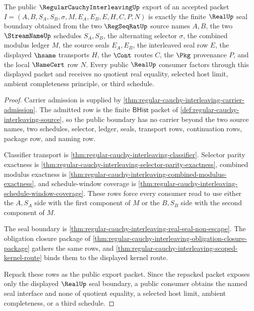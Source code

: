 \begin{theorem}
\label{thm:regular-cauchy-interleaving-public-real-seal-export}
The public $\RegularCauchyInterleavingUp$ export of an accepted packet $I=(A,B,S_A,S_B,\sigma,M,E_A,E_B,E,H,C,P,N)$ is exactly the finite $\RealUp$ seal boundary obtained from the two $\RegSeqRatUp$ source names $A,B$, the two $\StreamNameUp$ schedules $S_A,S_B$, the alternating selector $\sigma$, the combined modulus ledger $M$, the source seals $E_A,E_B$, the interleaved seal row $E$, the displayed $\hsame$ transports $H$, the $\Cont$ routes $C$, the $\Pkg$ provenance $P$, and the local $\NameCert$ row $N$. Every public $\RealUp$ consumer factors through this displayed packet and receives no quotient real equality, selected host limit, ambient completeness principle, or third schedule.
\end{theorem}
\begin{proof}
Carrier admission is supplied by \autoref{thm:regular-cauchy-interleaving-carrier-admission}. The admitted row is the finite $\mathsf{BHist}$ packet of \autoref{def:regular-cauchy-interleaving-source}, so the public boundary has no carrier beyond the two source names, two schedules, selector, ledger, seals, transport rows, continuation rows, package row, and naming row.

Classifier transport is \autoref{thm:regular-cauchy-interleaving-classifier}. Selector parity exactness is \autoref{thm:regular-cauchy-interleaving-selector-parity-exactness}, combined modulus exactness is \autoref{thm:regular-cauchy-interleaving-combined-modulus-exactness}, and schedule-window coverage is \autoref{thm:regular-cauchy-interleaving-schedule-window-coverage}. These rows force every consumer read to use either the $A,S_A$ side with the first component of $M$ or the $B,S_B$ side with the second component of $M$.

The seal boundary is \autoref{thm:regular-cauchy-interleaving-real-seal-non-escape}. The obligation closure package of \autoref{thm:regular-cauchy-interleaving-obligation-closure-package} gathers the same rows, and \autoref{thm:regular-cauchy-interleaving-scoped-kernel-route} binds them to the displayed kernel route.

Repack these rows as the public export packet. Since the repacked packet exposes only the displayed $\RealUp$ seal boundary, a public consumer obtains the named seal interface and none of quotient equality, a selected host limit, ambient completeness, or a third schedule.
\end{proof}

